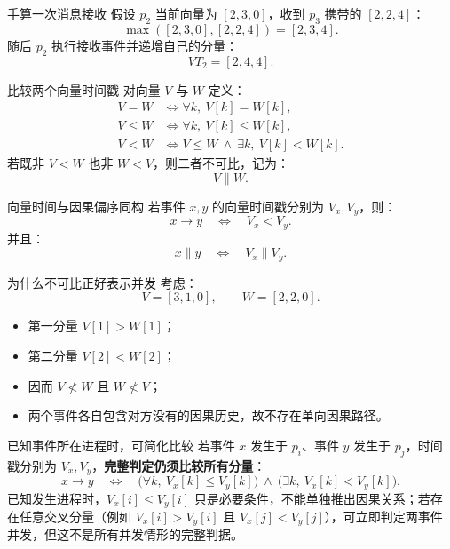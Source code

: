 \documentclass[UTF8,fontset=none,aspectratio=169,10pt]{beamer}
\begin{document}
\begin{frame}{手算一次消息接收}
假设 $p_2$ 当前向量为 $[2,3,0]$，收到 $p_3$ 携带的 $[2,2,4]$：
\[
\max([2,3,0],[2,2,4])=[2,3,4].
\]
随后 $p_2$ 执行接收事件并递增自己的分量：
\[
VT_2=[2,4,4].
\]
\vfill
{}
\end{frame}

\begin{frame}{比较两个向量时间戳}
对向量 $V$ 与 $W$ 定义：
\[
\begin{aligned}
V=W &\iff \forall k,\ V[k]=W[k],\\
V\le W &\iff \forall k,\ V[k]\le W[k],\\
V<W &\iff V\le W\ \land\ \exists k,\ V[k]<W[k].
\end{aligned}
\]
若既非 $V<W$ 也非 $W<V$，则二者不可比，记为：
\[
V\parallel W.
\]
\end{frame}

\begin{frame}{向量时间与因果偏序同构}
若事件 $x,y$ 的向量时间戳分别为 $V_x,V_y$，则：
\[
x\rightarrow y
\quad\Longleftrightarrow\quad
V_x<V_y.
\]
并且：
\[
x\parallel y
\quad\Longleftrightarrow\quad
V_x\parallel V_y.
\]
\vfill
{}
\end{frame}

\begin{frame}{为什么不可比正好表示并发}
考虑：
\[
V=[3,1,0],\qquad W=[2,2,0].
\]
\begin{itemize}
  \item 第一分量 $V[1]>W[1]$；
  \item 第二分量 $V[2]<W[2]$；
  \item 因而 $V\nless W$ 且 $W\nless V$；
  \item 两个事件各自包含对方没有的因果历史，故不存在单向因果路径。
\end{itemize}
\vfill
{}
\end{frame}

\begin{frame}{已知事件所在进程时，可简化比较}
若事件 $x$ 发生于 $p_i$、事件 $y$ 发生于 $p_j$，时间戳分别为 $V_x,V_y$，\textbf{完整判定仍须比较所有分量}：
\[
x\rightarrow y\quad\Longleftrightarrow\quad
\bigl(\forall k,\ V_x[k]\le V_y[k]\bigr)\ \land\ \bigl(\exists k,\ V_x[k]<V_y[k]\bigr).
\]
已知发生进程时，$V_x[i]\le V_y[i]$ 只是必要条件，不能单独推出因果关系；若存在任意交叉分量（例如 $V_x[i]>V_y[i]$ 且 $V_x[j]<V_y[j]$），可立即判定两事件并发，但这不是所有并发情形的完整判据。
\vfill
{}
\end{frame}
\end{document}
